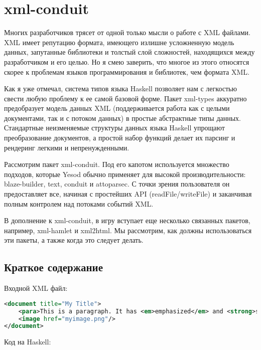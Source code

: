 \chapter{xml-conduit}

Многих разработчиков трясет от одной только мысли о работе с XML файлами. XML имеет репутацию формата, имеющего излишне усложненную модель данных, запутанные библиотеки и толстый слой сложностей, находящихся между разработчиком и его целью. Но я смею заверить, что многое из этого относятся скорее к проблемам языков программирования и библиотек, чем формата XML.

Как я уже отмечал, система типов языка Haskell позволяет нам с легкостью свести любую проблему к ее самой базовой форме. Пакет xml-types аккуратно предобразует модель данных XML (поддерживается работа как с целыми документами, так и с потоком данных) в простые абстрактные типы данных. Стандартные неизменяемые структуры данных языка Haskell упрощают преобразование документов, а простой набор функций делает их парсинг и рендеринг легкими и непренужденными. %

Рассмотрим пакет xml-conduit. Под его капотом используется множество подходов, которые Yesod обычно применяет для высокой производительности: blaze-builder, text, conduit и attoparsec. С точки зрения пользователя он предоставляет все, начиная с простейших API (readFile/writeFile) и заканчивая полным контролем над потоками событий XML.

В дополнение к xml-conduit, в игру вступает еще несколько связанных пакетов, например, xml-hamlet и xml2html. Мы рассмотрим, как должны использоваться эти пакеты, а также когда это следует делать.

\section{Краткое содержание} %

Входной XML файл:

\begin{lstlisting}[language=XML]
<document title="My Title">
    <para>This is a paragraph. It has <em>emphasized</em> and <strong>strong</strong> words.</para>
    <image href="myimage.png"/>
</document>
\end{lstlisting}

Код на Haskell:

